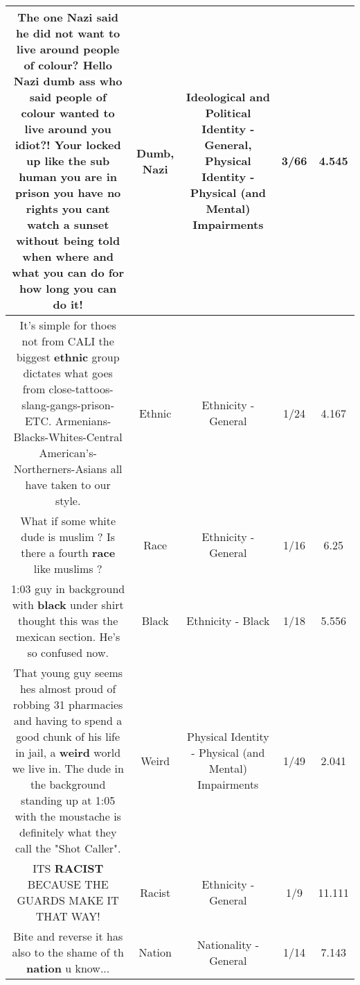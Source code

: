 \documentclass[11pt]{article}
\newlength\mylength
\begin{document}
\begin{center}
\begin{longtable}{|C{.65\mylength}|C{.30\mylength}|C{.12\mylength}|C{.12\mylength}|C{.12\mylength}|}
  \small The one \textbf{Nazi} said he did not want to live around people of colour? Hello \textbf{Nazi} \textbf{dumb} ass who said people of colour  wanted to live around you idiot?! Your locked up like the sub human you are  in prison you have no rights you cant watch a sunset without being told when where and what you can do for how long you can do it!\normalsize   & Dumb, Nazi &  Ideological and Political Identity - General, Physical Identity - Physical (and Mental) Impairments & 3/66 & 4.545 \\  \hline
  \small It's simple for thoes not from CALI the biggest \textbf{ethnic} group dictates what goes from close-tattoos-slang-gangs-prison-ETC. Armenians-Blacks-Whites-Central American's-Northerners-Asians all have taken to our style.\normalsize   & Ethnic & Ethnicity - General & 1/24 & 4.167 \\  \hline
  \small What if some white dude is muslim ? Is there a fourth \textbf{race} like muslims ?\normalsize   & Race & Ethnicity - General & 1/16 & 6.25 \\  \hline
  \small 1:03 guy in background with \textbf{black} under shirt thought this was the mexican section. He's so confused now.\normalsize   & Black & Ethnicity - Black & 1/18 & 5.556 \\  \hline
  \small That young guy seems hes almost proud of robbing 31 pharmacies and having to spend a good chunk of his life in jail, a \textbf{weird} world we live in. The dude in the background standing up at 1:05 with the moustache is definitely what they call the "Shot Caller".\normalsize   & Weird & Physical Identity - Physical (and Mental) Impairments & 1/49 & 2.041 \\  \hline
  \small ITS \textbf{RACIST} BECAUSE THE GUARDS MAKE IT THAT WAY!\normalsize   & Racist & Ethnicity - General & 1/9 & 11.111 \\  \hline
  \small Bite and reverse it has also to the shame of th \textbf{nation} u know...\normalsize   & Nation & Nationality - General & 1/14 & 7.143 \\  \hline

\end{longtable}
\end{center}
\end{document}
